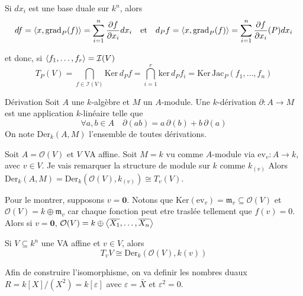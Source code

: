 \begin{note}[tion]
    Si \(dx_{i}\) est une base duale sur \(k^{n}\), alors 
    \[
      df = {\left\langle x, \mathrm{grad}_P{(f)}\right\rangle} = \sum_{i=1}^{n} \frac{\partial
      f}{\partial x_{i}} dx_{i} \quad \text{et} \quad
      d_Pf = {\left\langle x, \mathrm{grad}_P{(f)}\right\rangle} = \sum_{i=1}^{n} \frac{\partial
      f}{\partial x_{i}} {(P)} dx_{i} 
    \]

et donc, si \({\left\langle f_{1}, \dots, f_{r}\right\rangle} = \mathcal{I}{(V)}\) 
\[
  T_P{(V)} = \bigcap_{f \in \mathcal{I}{(V)}} \mathrm{Ker} \,d_Pf =
  \bigcap_{i=1}^{r}\mathrm{ker} \, d_P f_{i} = \mathrm{Ker} \, \mathrm{Jac}_P
  {(f_{1}, \dots, f_{n})}
\]
\end{note}

\begin{definition}{Dérivation}
    Soit \(A\) une \(k\)-algèbre et \(M\) un \(A\)-module. Une \(k\)-dérivation
    \(\partial : A \to M\) est une application \(k\)-linéaire telle que 
    \[
      \forall a, b \in A \quad \partial{(ab)} = a\,\partial{(b)} + b \,\partial{(a)}
    \]    
    On note \(\mathrm{Der}_k{(A, M)}\) l'ensemble de toutes dérivations.
\end{definition}

\begin{example}{}
    Soit \(A = \mathcal{O}{(V)}\) et \(V\) VA affine. Soit \(M = k\) vu comme
    \(A\)-module via \(\mathrm{ev}_v : A \to k\), avec \(v \in V\). Je vais
    remarquer la structure de module sur \(k\) comme \(k_{{(v)}} \)
    Alors \(\mathrm{Der}_k{(A, M)} = \mathrm{Der}_k {(\mathcal{O}{(V)},
    k_{{(v)}} )} \cong T_v{(V)}\). 

    Pour le montrer, supposons \(v = \mathbf{0} \). Notons que
    \(\mathrm{Ker}{(\mathrm{ev}_v)} = \mathfrak{m}_v \subseteq \mathcal{O}{(V)}
    \) et \(\mathcal{O}{(V)} = k \oplus \mathfrak{m}_v\) car chaque fonction
    peut etre traslée tellement que \(f{(v)} = 0\). Alors si \(v = \mathbf{0}
    \), \(\mathcal{O}{(V)} = k \oplus {\left\langle\overline{X_{1}}, \dots,
    \overline{X_{n}}\right\rangle}\) 
\end{example}

\begin{lemmao}{}
    Si \(V \subseteq k^{n}\) une VA affine et \(v \in V\), alors
    \[
      T_v V \cong \mathrm{Der}_k {\left( \mathcal{O}{(V)}, k{(v)} \right)} 
    \]
\end{lemmao}

Afin de construire l'isomorphisme, on va definir les nombres duaux \(R = k[X] /
{(X^2)} = k[\varepsilon]\) avec \(\varepsilon = \bar{X}\) et \(\varepsilon^2 =
0\).

